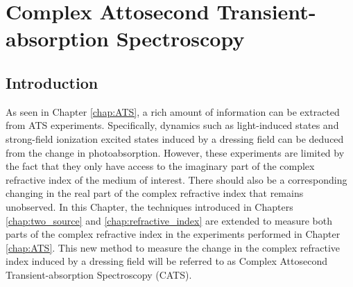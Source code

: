 \chapter{Complex Attosecond Transient-absorption Spectroscopy}
\label{chap:CATS}

\section{Introduction}
\label{sec:intro_cats}

As seen in Chapter \ref{chap:ATS}, a rich amount of information can be extracted from ATS experiments.  Specifically, dynamics such as light-induced states and strong-field ionization excited states induced by a dressing field can be deduced from the change in photoabsorption.  However, these experiments are limited by the fact that they only have access to the imaginary part of the complex refractive index of the medium of interest. There should also be a corresponding changing in the real part of the complex refractive index that remains unobserved.  In this Chapter, the techniques introduced in Chapters \ref{chap:two_source} and \ref{chap:refractive_index} are extended to measure both parts of the complex refractive index in the experiments performed in Chapter \ref{chap:ATS}.  This new method to measure the change in the complex refractive index induced by a dressing field will be referred to as Complex Attosecond Transient-absorption Spectroscopy (CATS).


